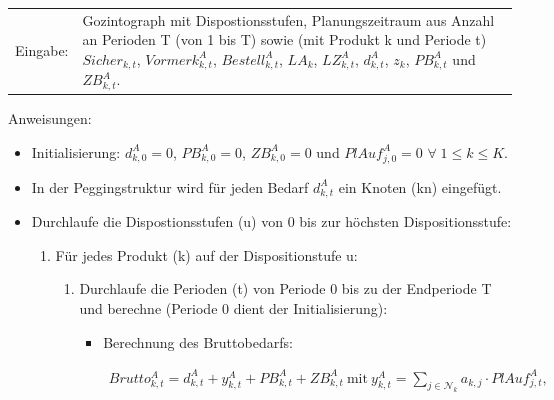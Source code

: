 \documentclass[13pt,a4paper, listof=entryprefix, bibliography=totocnumbered,toc=listofnumbered,lof=listofnumbered]{scrartcl}
\begin{document}
\begin{algorithmic}
	\label{algo:Algorithmus_MRP}
	\STATE
	\begin{tabularx}{\linewidth}{p{1.5 cm}X}
		Eingabe: & Gozintograph mit Dispostionsstufen, Planungszeitraum aus Anzahl an Perioden T (von 1 bis T) sowie (mit Produkt k und Periode t) $Sicher_{k,t}$, $Vormerk^{A}_{k,t}$, $Bestell^{A}_{k,t}$, $LA_{k}$, $LZ^{A}_{k,t}$, $d^{A}_{k,t}$, $z_{k}$, $PB^{A}_{k,t}$ und $ZB^{A}_{k,t}$.
	\end{tabularx}
	\addtocounter{table}{-1} %

	\hspace*{0,4cm}Anweisungen: \\
	\begin{itemize} [leftmargin=*]
		\item
		      Initialisierung: $d^{A}_{k,0} = 0$, $PB^{A}_{k,0} = 0$, $ZB^{A}_{k,0} = 0$ und $PlAuf^{A}_{j,0} = 0$ $\forall\; 1 \le k \le K$. \\

		\item In der Peggingstruktur wird für jeden Bedarf $d^{A}_{k,t}$ ein Knoten (kn) eingefügt. \\

		\item
		      Durchlaufe die Dispostionsstufen (u) von 0 bis zur höchsten Dispositionsstufe:
		      \begin{enumerate} [leftmargin=1.5em, label=]
			      \item
			            Für jedes Produkt (k) auf der Dispositionstufe u:
			            \begin{enumerate} [leftmargin=*, label= \arabic*.]
				            \item
				                  Durchlaufe die Perioden (t) von Periode 0 bis zu der Endperiode T und berechne (Periode 0 dient der Initialisierung):
				                  \begin{itemize} [leftmargin=*]
					                  \item Berechnung des Bruttobedarfs:
					                        \begin{fleqn}
						                        \begin{align*}
							                        Brutto^{A}_{k,t} = d^{A}_{k,t} + y^{A}_{k,t} + PB^{A}_{k,t} + ZB^{A}_{k,t} ~\text{mit} ~ y^{A}_{k,t} = \sum_{j \in \mathcal{N}_{k}} a_{k,j} \cdot PlAuf^{A}_{j,t}\text{,}
						                        \end{align*}
					                        \end{fleqn}


\end{itemize}
\end{enumerate}
\end{enumerate}
\end{itemize}
\end{algorithmic}
\end{document}
